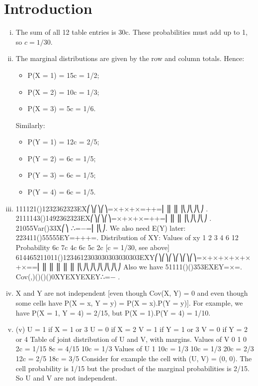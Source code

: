 \documentclass{article}
\author{kobriendublin }
\date{December 2018}
\begin{document}
\section{Introduction}
\begin{enumerate}[(i)]
\item  The sum of all 12 table entries is 30c. These probabilities must add up to 1, so $c = 1/30$.
\item The marginal distributions are given by the row and column totals.
Hence: 
\begin{itemize}
    \item P(X = 1) = 15c = 1/2; 
    \item P(X = 2) = 10c = 1/3; 
    \item P(X = 3) = 5c = 1/6.
\end{itemize}
Similarly:
\begin{itemize}
    \item P(Y = 1) = 12c = 2/5; 
    \item P(Y = 2) = 6c = 1/5; 
    \item P(Y = 3) = 6c = 1/5; 
    \item P(Y = 4) = 6c = 1/5.
    
\end{itemize}    
\item 111121()1232362323EX⎛⎞⎛⎞⎛⎞=×+×+×=++=⎜⎟⎜⎟⎜⎟⎝⎠⎝⎠⎝⎠ .
2111143()1492362323EX⎛⎞⎛⎞⎛⎞=×+×+×=++=⎜⎟⎜⎟⎜⎟⎝⎠⎝⎠⎝⎠ .
21055Var()33X⎛⎞ ∴=−=⎜⎟⎝⎠.
We also need E(Y) later: 223411()55555EY=+++=.
Distribution of XY:
  Values of xy
1
2
3
4
6
12
Probability
6c
7c
4c
6c
5c
2c
[c = 1/30, see above]
614465211011()1234612303030303030303EXY⎛⎞⎛⎞⎛⎞⎛⎞⎛⎞⎛⎞=×+×+×+×+×+×==⎜⎟⎜⎟⎜⎟⎜⎟⎜⎟⎜⎟⎝⎠⎝⎠⎝⎠⎝⎠⎝⎠⎝⎠
Also we have 51111()()353EXEY=×=.
Cov(,)()()()0XYEXYEXEY∴=− .
\item X and Y are not independent [even though Cov(X, Y) = 0 and even though some cells have P(X = x, Y = y) = P(X = x).P(Y = y)]. For example, we have P(X = 1, Y = 4) = 2/15, but P(X = 1).P(Y = 4) = 1/10.
\item (v) U = 1 if X = 1 or 3 U = 0 if X = 2
V = 1 if Y = 1 or 3 V = 0 if Y = 2 or 4
Table of joint distribution of U and V, with margins.
Values of V
0
1
0
2c = 1/15
8c = 4/15
10c = 1/3
Values of U
1
10c = 1/3
10c = 1/3
20c = 2/3
12c = 2/5
18c = 3/5
Consider for example the cell with (U, V) = (0, 0). The cell probability is 1/15 but the product of the marginal probabilities is 2/15. So U and V are not independent.
\end{enumerate}
\end{document}
